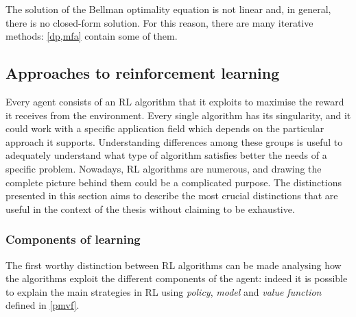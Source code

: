The solution of the Bellman optimality equation is not linear and, in general, there is no closed-form solution.
For this reason, there are many iterative methods: \vref{dp,mfa} contain some of them.


\subsection{Approaches to reinforcement learning} \label{approaches}

Every agent consists of an RL algorithm that it exploits to maximise the reward it receives from the environment.
Every single algorithm has its singularity, and it could work with a specific application field which depends on the particular approach it supports.
Understanding differences among these groups is useful to adequately understand what type of algorithm satisfies better the needs of a specific problem.
Nowadays, RL algorithms are numerous, and drawing the complete picture behind them could be a complicated purpose.
The distinctions presented in this section aims to describe the most crucial distinctions that are useful in the context of the thesis without claiming to be exhaustive.

\subsubsection{Components of learning}

The first worthy distinction between RL algorithms can be made analysing how the algorithms exploit the different components of the agent: indeed it is possible to explain the main strategies in RL using \textit{policy}, \textit{model} and \textit{value function} defined in \vref{pmvf}.


